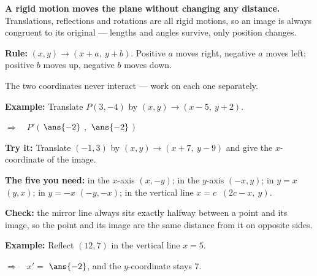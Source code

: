 \documentclass[12pt]{article}
\begin{document}

\begin{formulabox}
\textbf{A rigid motion moves the plane without changing any distance.} Translations, reflections and rotations are all rigid motions, so an image is always congruent to its original --- lengths and angles survive, only position changes.
\end{formulabox}


\begin{formulabox}
\textbf{Rule:} $(x, y) \to (x + a,\ y + b)$. Positive $a$ moves right, negative $a$ moves left; positive $b$ moves up, negative $b$ moves down.\par
The two coordinates never interact --- work on each one separately.
\end{formulabox}

\begin{examplebox}
\textbf{Example:} \quad Translate $P(3, -4)$ by $(x, y) \to (x - 5,\ y + 2)$.

$\Rightarrow\quad P'\,($ $\ans{-2}$ $,$ $\ans{-2}$ $)$
\end{examplebox}

\begin{tryitbox}
\textbf{Try it:} \quad Translate $(-1, 3)$ by $(x, y) \to (x + 7,\ y - 9)$ and give the $x$-coordinate of the image.\\[2pt]
\end{tryitbox}


\begin{formulabox}
\textbf{The five you need:} in the $x$-axis $(x, -y)$; in the $y$-axis $(-x, y)$; in $y = x$ $(y, x)$; in $y = -x$ $(-y, -x)$; in the vertical line $x = c$ $\ (2c - x,\ y)$.\par
\textbf{Check:} the mirror line always sits exactly halfway between a point and its image, so the point and its image are the same distance from it on opposite sides.
\end{formulabox}

\begin{examplebox}
\textbf{Example:} \quad Reflect $(12, 7)$ in the vertical line $x = 5$.

$\Rightarrow\quad x' = $ $\ans{-2}$, and the $y$-coordinate stays $7$.
\end{examplebox}
\end{document}

